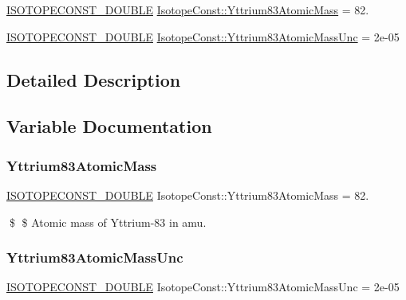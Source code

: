 \begin{DoxyCompactItemize}
\item 
\mbox{\hyperlink{group___isotope_const-_macros_ga8f45a7272ce02c0b4c65c44636ed719a}{I\+S\+O\+T\+O\+P\+E\+C\+O\+N\+S\+T\+\_\+\+D\+O\+U\+B\+LE}} \mbox{\hyperlink{group___isotope_const-_yttrium-_y83_ga1e435c877239f4b366800fa1a6e8a16e}{Isotope\+Const\+::\+Yttrium83\+Atomic\+Mass}} = 82.
\item 
\mbox{\hyperlink{group___isotope_const-_macros_ga8f45a7272ce02c0b4c65c44636ed719a}{I\+S\+O\+T\+O\+P\+E\+C\+O\+N\+S\+T\+\_\+\+D\+O\+U\+B\+LE}} \mbox{\hyperlink{group___isotope_const-_yttrium-_y83_gaebf90c82c281031d5bb5e4d7a1fd1698}{Isotope\+Const\+::\+Yttrium83\+Atomic\+Mass\+Unc}} = 2e-\/05
\end{DoxyCompactItemize}


\subsection{Detailed Description}


\subsection{Variable Documentation}
\mbox{\label{group___isotope_const-_yttrium-_y83_ga1e435c877239f4b366800fa1a6e8a16e}} 
\subsubsection{\texorpdfstring{Yttrium83\+Atomic\+Mass}{Yttrium83AtomicMass}}
{\footnotesize\ttfamily \mbox{\hyperlink{group___isotope_const-_macros_ga8f45a7272ce02c0b4c65c44636ed719a}{I\+S\+O\+T\+O\+P\+E\+C\+O\+N\+S\+T\+\_\+\+D\+O\+U\+B\+LE}} Isotope\+Const\+::\+Yttrium83\+Atomic\+Mass = 82.}

\$ \$ Atomic mass of Yttrium-\/83 in amu. \mbox{\label{group___isotope_const-_yttrium-_y83_gaebf90c82c281031d5bb5e4d7a1fd1698}} 
\subsubsection{\texorpdfstring{Yttrium83\+Atomic\+Mass\+Unc}{Yttrium83AtomicMassUnc}}
{\footnotesize\ttfamily \mbox{\hyperlink{group___isotope_const-_macros_ga8f45a7272ce02c0b4c65c44636ed719a}{I\+S\+O\+T\+O\+P\+E\+C\+O\+N\+S\+T\+\_\+\+D\+O\+U\+B\+LE}} Isotope\+Const\+::\+Yttrium83\+Atomic\+Mass\+Unc = 2e-\/05}

